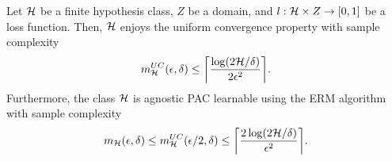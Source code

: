 \documentclass[11pt,a4paper]{article}
\begin{document}

\begin{prop}
Let $\mathcal{H}$ be a finite hypothesis class, $Z$ be a domain, and $l:\mathcal{H}\times Z\rightarrow [0,1]$ be a loss function. Then, $\mathcal{H}$ enjoys the uniform convergence property with sample complexity
\begin{equation*}
m_{\mathcal{H}}^{UC}(\epsilon,\delta)\le \bigg\lceil \dfrac{\log(2\mathcal{H}/\delta)}{2\epsilon^2} \bigg\rceil.
\end{equation*}
Furthermore, the class $\mathcal{H}$ is agnostic PAC learnable using the ERM algorithm with sample complexity
\begin{equation*}
m_{\mathcal{H}}(\epsilon,\delta)\le m_{\mathcal{H}}^{UC}(\epsilon/2,\delta)\le \bigg\lceil \dfrac{2\log(2\mathcal{H}/\delta)}{\epsilon^2} \bigg\rceil.
\end{equation*}
\end{prop}
\end{document}
